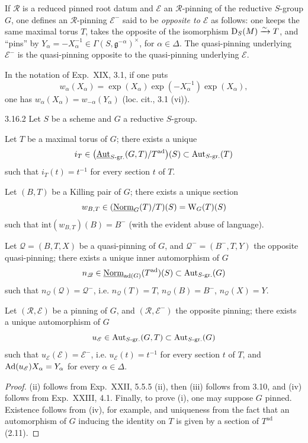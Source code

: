 If $\mathscr R$ is a reduced pinned root datum and $\mathscr E$ an $\mathscr R$-pinning of the reductive $S$-group $G$, one defines an $\mathscr R$-pinning $\mathscr E^-$ said to be \emph{opposite to $\mathscr E$} as follows: one keeps the same maximal torus $T$, takes the opposite of the isomorphism $\mathrm D_S(M)\xrightarrow{\sim} T$, and ``pins'' by $Y_\alpha=-X_\alpha^{-1}\in\Gamma(S,\mathfrak g^{-\alpha})^\times$, for $\alpha\in\Delta$. The quasi-pinning underlying $\mathscr E^-$ is the quasi-pinning opposite to the quasi-pinning underlying $\mathscr E$.
\begin{remark*}
In the notation of Exp.~XIX, 3.1, if one puts
\[
w_\alpha(X_\alpha)=\exp(X_\alpha)\exp(-X_\alpha^{-1})\exp(X_\alpha),
\]
one has $w_\alpha(X_\alpha)=w_{-\alpha}(Y_\alpha)$ (loc. cit., 3.1 (vi)).
\end{remark*}
\begin{proposition}{3.16.2}\label{XXIV.3.16.2}
Let $S$ be a scheme and $G$ a reductive $S$-group.
\begin{enumeratei}
\item Let $T$ be a maximal torus of $G$; there exists a unique
\[
i_T\in\bigl(\underline{\operatorname{Aut}}_{S\text{-gr.}}(G,T)/T^{\mathrm{ad}}\bigr)(S)\subset\operatorname{Aut}_{S\text{-gr.}}(T)
\]
such that $i_T(t)=t^{-1}$ for every section $t$ of $T$.
\item Let $(B,T)$ be a Killing pair of $G$; there exists a unique section
\[
w_{B,T}\in(\underline{\mathrm{Norm}}_G(T)/T)(S)=\mathrm W_G(T)(S)
\]
such that $\mathrm{int}(w_{B,T})(B)=B^-$ (with the evident abuse of language).
\item Let $\mathscr Q=(B,T,X)$ be a quasi-pinning of $G$, and $\mathscr Q^-=(B^-,T,Y)$ the opposite quasi-pinning; there exists a unique inner automorphism of $G$
\[
n_{\mathscr Q}\in\underline{\mathrm{Norm}}_{\operatorname{ad}(G)}(T^{\mathrm{ad}})(S)\subset\operatorname{Aut}_{S\text{-gr.}}(G)
\]
such that $n_{\mathscr Q}(\mathscr Q)=\mathscr Q^-$, i.e. $n_{\mathscr Q}(T)=T$, $n_{\mathscr Q}(B)=B^-$, $n_{\mathscr Q}(X)=Y$.
\item Let $(\mathscr R,\mathscr E)$ be a pinning of $G$, and $(\mathscr R,\mathscr E^-)$ the opposite pinning; there exists a unique automorphism of $G$
\[
u_{\mathscr E}\in\operatorname{Aut}_{S\text{-gr.}}(G,T)\subset\operatorname{Aut}_{S\text{-gr.}}(G)
\]
such that $u_{\mathscr E}(\mathscr E)=\mathscr E^-$, i.e. $u_{\mathscr E}(t)=t^{-1}$ for every section $t$ of $T$, and $\operatorname{Ad}(u_{\mathscr E})X_\alpha=Y_\alpha$ for every $\alpha\in\Delta$.
\end{enumeratei}
\end{proposition}
\begin{proof}
(ii) follows from Exp.~XXII, 5.5.5 (ii), then (iii) follows from 3.10, and (iv) follows from Exp.~XXIII, 4.1. Finally, to prove (i), one may suppose $G$ pinned. Existence follows from (iv), for example, and uniqueness from the fact that an automorphism of $G$ inducing the identity on $T$ is given by a section of $T^{\mathrm{ad}}$ (2.11).
\end{proof}

